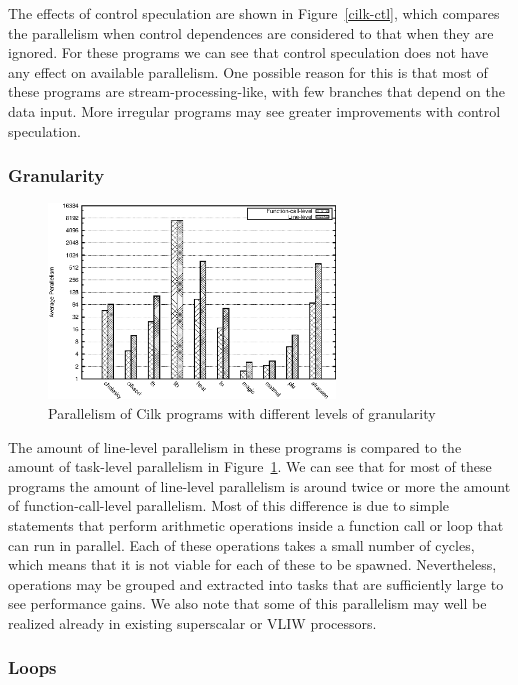 The effects of control speculation are shown in Figure~\ref{cilk-ctl}, which compares the parallelism when control dependences are considered to that when they are ignored.
For these programs we can see that control speculation does not have any effect on available parallelism.
One possible reason for this is that most of these programs are stream-processing-like, with few branches that depend on the data input.
More irregular programs may see greater improvements with control speculation.

\subsubsection{Granularity}

\begin{figure}
 \centering
 \includegraphics[width=3in]{cilk-gran}
 \caption{Parallelism of Cilk programs with different levels of granularity}
 \label{cilk-gran}
\end{figure}

The amount of line-level parallelism in these programs is compared to the amount of task-level parallelism in Figure~\ref{cilk-gran}.
We can see that for most of these programs the amount of line-level parallelism is around twice or more the amount of function-call-level parallelism.
Most of this difference is due to simple statements that perform arithmetic operations inside a function call or loop that can run in parallel.
Each of these operations takes a small number of cycles, which means that it is not viable for each of these to be spawned.
Nevertheless, operations may be grouped and extracted into tasks that are sufficiently large to see performance gains.
We also note that some of this parallelism may well be realized already in existing superscalar or VLIW processors.

\subsubsection{Loops}

